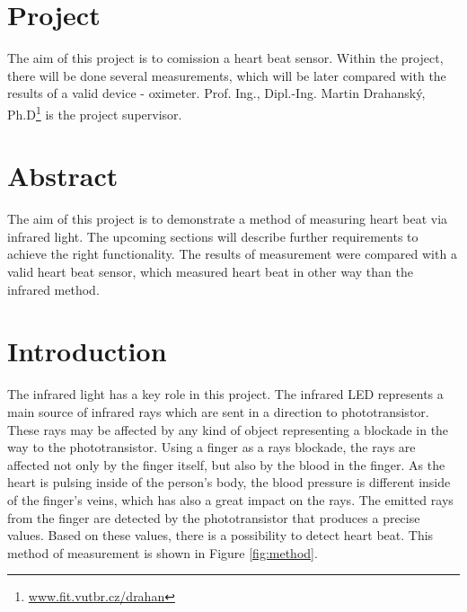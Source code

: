 \documentclass[11pt,a4paper]{article}
\newcommand{\tilda}{\raisebox{0.5ex}{\texttildelow}}
\begin{document}


\setlength{\parskip}{0pt}
\hypersetup{hidelinks}\tableofcontents
\setlength{\parskip}{0pt}

\newpage

\section{Project}

The aim of this project is to comission a heart beat sensor. Within the project, there will be done several measurements, which will be later compared with the results of a valid device - oximeter. Prof. Ing., Dipl.-Ing. Martin Drahanský, Ph.D\footnote{\href{http://www.fit.vutbr.cz/~drahan/}{www.fit.vutbr.cz/{\tilda}drahan}} is the project supervisor.

\section{Abstract}

The aim of this project is to demonstrate a method of measuring heart beat via infrared light. The upcoming sections will describe further requirements to achieve the right functionality. The results of measurement were compared with a valid heart beat sensor, which measured heart beat in other way than the infrared method.

\section{Introduction}

The infrared light has a key role in this project. The infrared LED represents a main source of infrared rays which are sent in a direction to phototransistor. These rays may be affected by any kind of object representing a blockade in the way to the phototransistor. Using a finger as a rays blockade, the rays are affected not only by the finger itself, but also by the blood in the finger. As the heart is pulsing inside of the person's body, the blood pressure is different inside of the finger's veins, which has also a great impact on the rays. The emitted rays from the finger are detected by the phototransistor that produces a precise values. Based on these values, there is a possibility to detect heart beat. This method of measurement is shown in Figure \ref{fig:method}.
\end{document}
